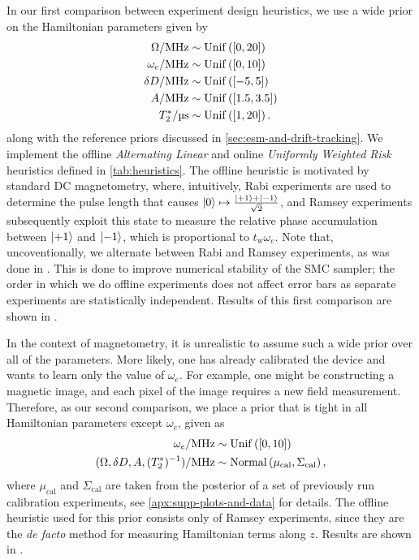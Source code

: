 \documentclass[aps,nofootinbib,twocolumn,superscriptaddress]{revtex4}
\newcommand{\calib}{{\text{cal}}}
\newcommand{\tw}{t_\text{w}}
\begin{document}
In our first comparison between experiment design heuristics, 
we use a wide prior on the Hamiltonian 
parameters given by
\begin{subequations}
\begin{align}
    \Omega/\si{MHz} 
        &\sim \uniformdist\left( [0, 20] \right) \\
    \omega_e/\si{MHz} 
        &\sim \uniformdist\left( [0, 10] \right) \\
    \delta D/\si{MHz} 
        &\sim \uniformdist\left( [-5, 5] \right) \\
    A/\si{MHz} 
        &\sim \uniformdist\left( [1.5, 3.5] \right) \\
    T_2^*/\si{\micro\second} 
        &\sim \uniformdist\left( [1, 20] \right).
\end{align}
\label{eq:wide-prior}
\end{subequations}
along with the reference priors discussed in 
\autoref{sec:esm-and-drift-tracking}.
We implement the offline \textit{Alternating Linear} and
online \textit{Uniformly Weighted Risk} heuristics
defined in \autoref{tab:heuristics}.
The offline heuristic is motivated by standard DC magnetometry,
where, intuitively, Rabi experiments are used to determine the pulse length
that causes $\ket{0}\mapsto\frac{\ket{+1}+\ket{-1}}{\sqrt{2}}$, 
and Ramsey experiments subsequently exploit  this state
to measure the relative
phase accumulation between $\ket{+1}$ and $\ket{-1}$, which is
proportional to $\tw \omega_e$.
Note that, uncoventionally, we alternate between Rabi and Ramsey 
experiments, as was done in \cite{hincks_statistical_2018}.
This is done to improve numerical stability of the SMC sampler; the
order in which we do offline experiments does not affect error bars
as separate experiments are statistically independent.
Results of this first comparison 
are shown in .

In the context of magnetometry, it is unrealistic to assume such a
wide prior over all of the parameters.
More likely, one has already calibrated the device and wants to
learn only the value of $\omega_e$.
For example, one might be constructing a magnetic image\citeneed, and each
pixel of the image requires a new field measurement.
Therefore, as our second comparison, we place a prior that is tight in all
Hamiltonian parameters except $\omega_e$, given as
\begin{subequations}
\begin{align}
    \omega_e/\si{MHz} 
        &\sim \uniformdist\left( [0, 10] \right) \\
    (\Omega,\delta D,A,(T_2^*)^{-1})/\si{MHz}
        &\sim \normaldist\left(
            \mu_\calib,
            \Sigma_\calib
        \right),
\end{align}
\label{eq:calibrated-prior}
\end{subequations}
where $\mu_\calib$ and $\Sigma_\calib$ are taken
from the posterior of a set of previously run calibration
experiments, see \autoref{apx:supp-plots-and-data} for
details.
The offline heuristic used for this prior consists
only of Ramsey experiments, since they are the
\textit{de facto} method for measuring Hamiltonian terms 
along $z$.
Results are shown in .
\end{document}
